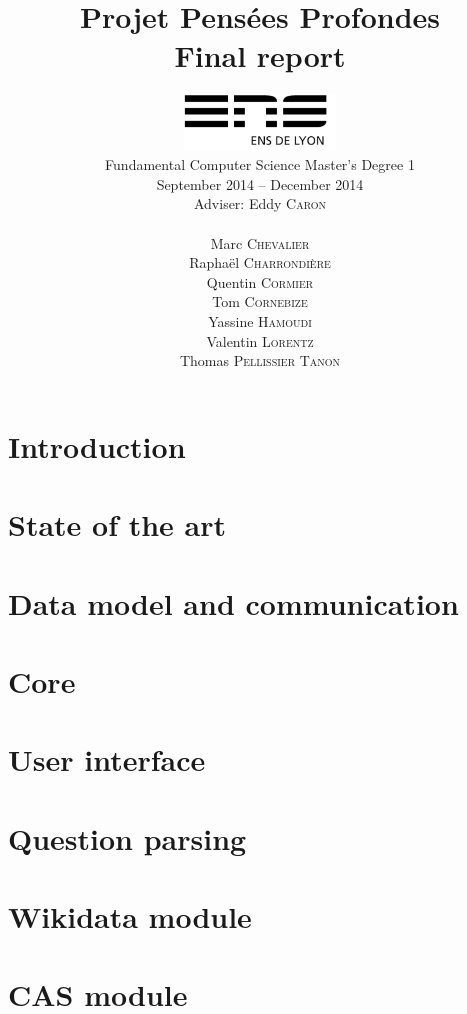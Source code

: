 \documentclass[a4paper,10pt]{report}
\title{Projet Pensées Profondes\\\large Final report}
\author{\includegraphics[width=0.3\textwidth]{../logo_ensl.pdf}\\[50pt]
Fundamental Computer Science Master's Degree 1\\September 2014 \--- December 2014\\[50pt]
Adviser: Eddy \textsc{Caron}\\[50pt]
\begin{minipage}{0.4\textwidth}
    \begin{flushleft} \large
        Marc \textsc{Chevalier}
        \\
        Raphaël \textsc{Charrondière}
        \\
        Quentin \textsc{Cormier}
        \\
        Tom \textsc{Cornebize}
    \end{flushleft}
\end{minipage}
\begin{minipage}{0.4\textwidth}
    \begin{flushright} \large
        Yassine \textsc{Hamoudi}
        \\
        Valentin \textsc{Lorentz}
        \\
        Thomas \textsc{Pellissier Tanon}
        \\
    \end{flushright}
\end{minipage}
}
\date{}
\begin{document}
\maketitle

\tableofcontents

\chapter*{Introduction}
    \label{introduction}
    

\chapter{State of the art}
    \label{stateofart}
    

\chapter{Data model and communication}
    \label{datamodel}
    

\chapter{Core}
    \label{core}
    

\chapter{User interface}
    \label{UI}
    

\chapter{Question parsing}
    \label{questionparsing}
    
    \label{grammatical}
    
    \label{reformulation}
    
    \label{standalone}
    

\chapter{Wikidata module}
    \label{wikidata}
    
    
\chapter{CAS module}
    \label{cas}
    
\end{document}
